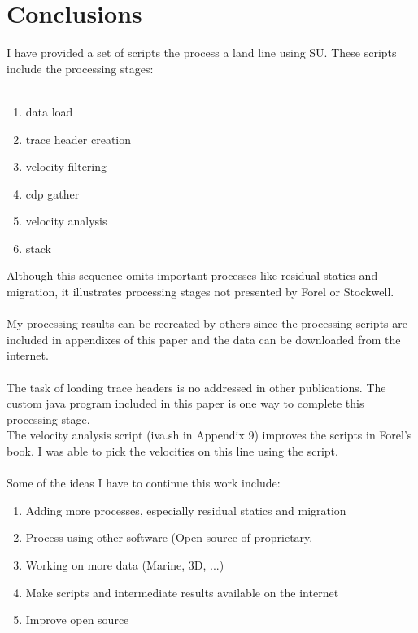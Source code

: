\section{Conclusions}
I have provided a set of scripts the process a land line using SU.  These scripts include the processing stages:\\
\\
\begin{enumerate}
\item data load
\item trace header creation
\item velocity filtering 
\item cdp gather
\item velocity analysis
\item stack
\end{enumerate}

Although this sequence omits important processes like residual statics and migration, it illustrates processing stages not presented by Forel or Stockwell.\\
\\
My processing results can be recreated by others since the processing scripts are included in appendixes of this paper and the data can be downloaded from the internet.\\
\\
The task of loading trace headers is no addressed in other publications.  The custom java program included in this paper is one way to complete this processing stage.\\
The velocity analysis script (iva.sh in Appendix 9)  improves the scripts in Forel's book.  I was able to pick the velocities on this line using the script.\\
\\
Some of the ideas I have to continue this work include:\\
\begin{enumerate}
\item Adding more processes, especially residual statics and migration
\item Process using other software (Open source of proprietary.
\item Working on more data (Marine, 3D, ...)
\item Make scripts and intermediate results available on the internet
\item Improve open source
\end{enumerate}






